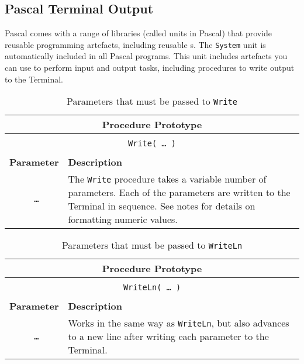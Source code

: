 \clearpage
\subsection{Pascal Terminal Output} %
\label{sub:pascal_console_output}

Pascal comes with a range of libraries (called units in Pascal) that provide reusable programming artefacts, including reusable s. The \texttt{System} unit is automatically included in all Pascal programs. This unit includes artefacts you can use to perform input and output tasks, including procedures to write output to the Terminal.

\begin{table}[h]
  \centering
  \begin{tabular}{|c|p{9cm}|}
    \hline
    \multicolumn{2}{|c|}{\textbf{Procedure Prototype}} \\
    \hline
    \multicolumn{2}{|c|}{} \\
    \multicolumn{2}{|c|}{\texttt{Write( {\ldots} )}} \\
    \multicolumn{2}{|c|}{} \\
    \hline
    \textbf{Parameter} & \textbf{Description} \\
    \hline
    \texttt{ \ldots } & The \texttt{Write} procedure takes a variable number of parameters. Each of the parameters are written to the Terminal in sequence. See notes for details on formatting numeric values. \\
    \hline
  \end{tabular}
  \caption{Parameters that must be passed to \texttt{Write}}
  \label{tbl:program-creation-pas write parameters}
\end{table}

\begin{table}[h]
  \centering
  \begin{tabular}{|c|p{9cm}|}
    \hline
    \multicolumn{2}{|c|}{\textbf{Procedure Prototype}} \\
    \hline
    \multicolumn{2}{|c|}{} \\
    \multicolumn{2}{|c|}{\texttt{WriteLn( {\ldots} )}} \\
    \multicolumn{2}{|c|}{} \\
    \hline
    \textbf{Parameter} & \textbf{Description} \\
    \hline
    \texttt{ \ldots } & Works in the same way as \texttt{WriteLn}, but also advances to a new line after writing each parameter to the Terminal. \\
    \hline
  \end{tabular}
  \caption{Parameters that must be passed to \texttt{WriteLn}}
  \label{tbl:program-creation-pas writeln parameters}
\end{table}

